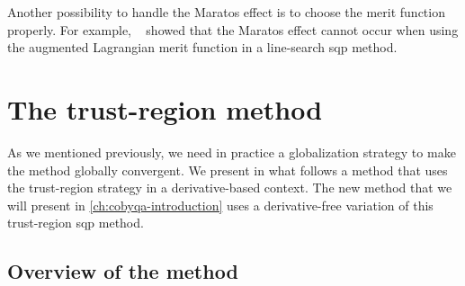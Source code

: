 Another possibility to handle the Maratos effect is to choose the merit function properly.
For example, \citeauthor{Powell_Yuan_1986}~\cite[\S~4]{Powell_Yuan_1986} showed that the Maratos effect cannot occur when using the augmented Lagrangian merit function in a line-search \gls{sqp} method.

\section{The trust-region  method}

As we mentioned previously, we need in practice a globalization strategy to make the method globally convergent.
We present in what follows a method that uses the trust-region strategy in a derivative-based context.
The new method that we will present in \cref{ch:cobyqa-introduction} uses a derivative-free variation of this trust-region \gls{sqp} method.

\subsection{Overview of the method}

